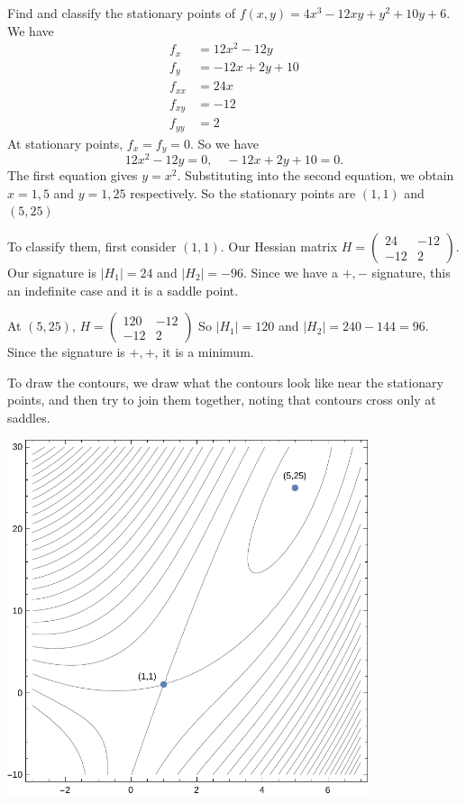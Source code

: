 \documentclass[a4paper]{article}
\begin{document}
\begin{eg}
  Find and classify the stationary points of $f(x, y) = 4x^3 - 12xy + y^2 + 10y + 6$. We have
  \begin{align*}
    f_x &= 12x^2 - 12y\\
    f_y &= -12x + 2y + 10\\
    f_{xx} &= 24x\\
    f_{xy} &= -12\\
    f_{yy} &= 2
  \end{align*}
  At stationary points, $f_x = f_y = 0$. So we have
  \[
    12x^2 - 12y = 0,\quad -12x + 2y + 10 = 0.
  \]
  The first equation gives $y = x^2$. Substituting into the second equation, we obtain $x = 1, 5$ and $y = 1, 25$ respectively. So the stationary points are $(1, 1)$ and $(5, 25)$

  To classify them, first consider $(1, 1)$. Our Hessian matrix $H =
  \begin{pmatrix}
    24 & -12\\
    -12 & 2
  \end{pmatrix}$. Our signature is $|H_1| = 24$ and $|H_2| = -96$. Since we have a $+, -$ signature, this an indefinite case and it is a saddle point.

  At $(5, 25)$, $H =
  \begin{pmatrix}
    120 & -12\\
    -12 & 2
  \end{pmatrix}$
  So $|H_1| = 120$ and $|H_2| = 240 - 144 = 96$. Since the signature is $+, +$, it is a minimum.

  To draw the contours, we draw what the contours look like near the stationary points, and then try to join them together, noting that contours cross only at saddles.
  \begin{center}
    \includegraphics[width=300pt]{images/de_contour.pdf}
  \end{center}
\end{eg}
\end{document}
